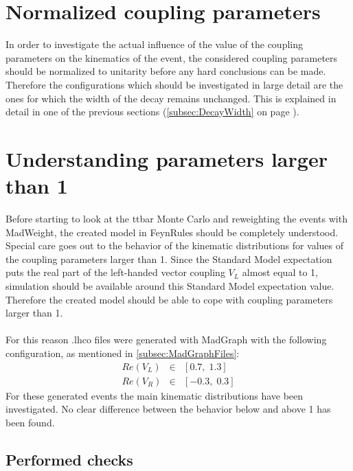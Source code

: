 \documentclass[a4paper,12pt]{report}
\begin{document}
\section{Normalized coupling parameters}
In order to investigate the actual influence of the value of the coupling parameters on the kinematics of the event, the considered coupling parameters should be normalized to unitarity before any hard conclusions can be made.
Therefore the configurations which should be investigated in large detail are the ones for which the width of the decay remains unchanged. This is explained in detail in one of the previous sections (\ref{subsec:DecayWidth} on page \pageref{subsec:DecayWidth}).

\section{Understanding parameters larger than 1}
Before starting to look at the ttbar Monte Carlo and reweighting the events with MadWeight, the created model in FeynRules should be completely understood.
Special care goes out to the behavior of the kinematic distributions for values of the coupling parameters larger than 1. Since the Standard Model expectation puts the real part of the left-handed vector coupling $V_L$ almost equal to 1, simulation should be available around this Standard Model expectation value.
Therefore the created model should be able to cope with coupling parameters larger than 1. \\
\\
For this reason .lhco files were generated with MadGraph with the following configuration, as mentioned in \ref{subsec:MadGraphFiles}:
\begin{eqnarray*}
  Re(V_L) & \in & \left[  0.7, \; 1.3\right] \\
  Re(V_R) & \in & \left[ -0.3, \; 0.3\right]
\end{eqnarray*}
For these generated events the main kinematic distributions have been investigated.
No clear difference between the behavior below and above 1 has been found.

\newpage
\subsection{Performed checks}
\end{document}
